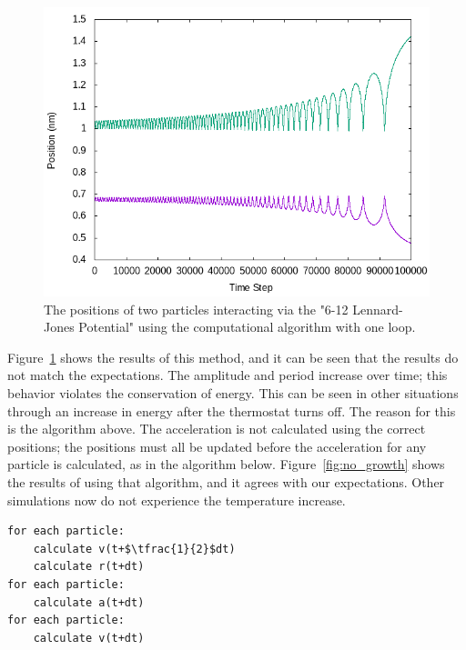 \documentclass[]{article}
\begin{document}
\begin{figure}[htb]
	\centering
	\includegraphics[width=\textwidth]{figures/temp_growth.png}
	\caption{The positions of two particles interacting via the "6-12 Lennard-Jones Potential" using the computational algorithm with one loop.}
	\label{fig:temp_growth}
\end{figure}

Figure~\ref{fig:temp_growth} shows the results of this method, and it can be seen that the results do not match the expectations.
The amplitude and period increase over time; this behavior violates the conservation of energy.
This can be seen in other situations through an increase in energy after the thermostat turns off.
The reason for this is the algorithm above.
The acceleration is not calculated using the correct positions; the positions must all be updated before the acceleration for any particle is calculated, as in the algorithm below.
Figure~\ref{fig:no_growth} shows the results of using that algorithm, and it agrees with our expectations.
Other simulations now do not experience the temperature increase.

\begin{lstlisting}[mathescape]
for each particle:
	calculate v(t+$\tfrac{1}{2}$dt)
	calculate r(t+dt)
for each particle:
	calculate a(t+dt)
for each particle:
	calculate v(t+dt)
\end{lstlisting}
\end{document}
